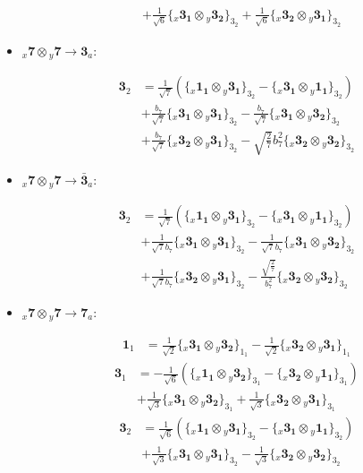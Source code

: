 \documentclass[english]{article}
\newcommand{\rep}[1]{\mathbf{#1}}
\newcommand{\repx}[2]{{}_{#2}\mathbf{#1}}
\newcommand{\tsprodx}[2]{\repx{#1}{x}\otimes\repx{#2}{y}}
\newcommand{\subcgs}[3]{\big\{ \tsprodx{#1}{#2}\big\}^{}_{#3}}
\begin{document}
\begin{itemize}
\begin{fleqn}
\begin{align*}
 & +\frac{1}{\sqrt{6}}\subcgs{3_{1}}{3_{2}}{3_{2}}+\frac{1}{\sqrt{6}}\subcgs{3_{2}}{3_{1}}{3_{2}}
\end{align*}
\end{fleqn}
\item $\tsprodx{7}{7}\to\rep{3}_{a}$:
\begin{fleqn}
\begin{align*}
\rep{3}_{2} & = \frac{1}{\sqrt{7}}\left(\subcgs{1_{1}}{3_{1}}{3_{2}}-\subcgs{3_{1}}{1_{1}}{3_{2}}\right) \\ 
 & +\frac{b_7}{\sqrt{7}}\subcgs{3_{1}}{3_{1}}{3_{2}}-\frac{b_7}{\sqrt{7}}\subcgs{3_{1}}{3_{2}}{3_{2}} \\ 
 & +\frac{b_7}{\sqrt{7}}\subcgs{3_{2}}{3_{1}}{3_{2}}-\sqrt{\frac{2}{7}} b_7^2\subcgs{3_{2}}{3_{2}}{3_{2}}
\end{align*}
\end{fleqn}
\item $\tsprodx{7}{7}\to\rep{\bar{3}}_{a}$:
\begin{fleqn}
\begin{align*}
\rep{3}_{2} & = \frac{1}{\sqrt{7}}\left(\subcgs{1_{1}}{3_{1}}{3_{2}}-\subcgs{3_{1}}{1_{1}}{3_{2}}\right) \\ 
 & +\frac{1}{\sqrt{7} b_7}\subcgs{3_{1}}{3_{1}}{3_{2}}-\frac{1}{\sqrt{7} b_7}\subcgs{3_{1}}{3_{2}}{3_{2}} \\ 
 & +\frac{1}{\sqrt{7} b_7}\subcgs{3_{2}}{3_{1}}{3_{2}}-\frac{\sqrt{\frac{2}{7}}}{b_7^2}\subcgs{3_{2}}{3_{2}}{3_{2}}
\end{align*}
\end{fleqn}
\item $\tsprodx{7}{7}\to\rep{7}_{a}$:
\begin{fleqn}
\begin{align*}
\rep{1}_{1} & = \frac{1}{\sqrt{2}}\subcgs{3_{1}}{3_{2}}{1_{1}}-\frac{1}{\sqrt{2}}\subcgs{3_{2}}{3_{1}}{1_{1}}
\end{align*}
\begin{align*}
\rep{3}_{1} & = -\frac{1}{\sqrt{6}}\left(\subcgs{1_{1}}{3_{2}}{3_{1}}-\subcgs{3_{2}}{1_{1}}{3_{1}}\right) \\ 
 & +\frac{1}{\sqrt{3}}\subcgs{3_{1}}{3_{2}}{3_{1}}+\frac{1}{\sqrt{3}}\subcgs{3_{2}}{3_{1}}{3_{1}}
\end{align*}
\begin{align*}
\rep{3}_{2} & = \frac{1}{\sqrt{6}}\left(\subcgs{1_{1}}{3_{1}}{3_{2}}-\subcgs{3_{1}}{1_{1}}{3_{2}}\right) \\ 
 & +\frac{1}{\sqrt{3}}\subcgs{3_{1}}{3_{1}}{3_{2}}-\frac{1}{\sqrt{3}}\subcgs{3_{2}}{3_{2}}{3_{2}}

\end{align*}
\end{fleqn}
\end{itemize}
\end{document}
